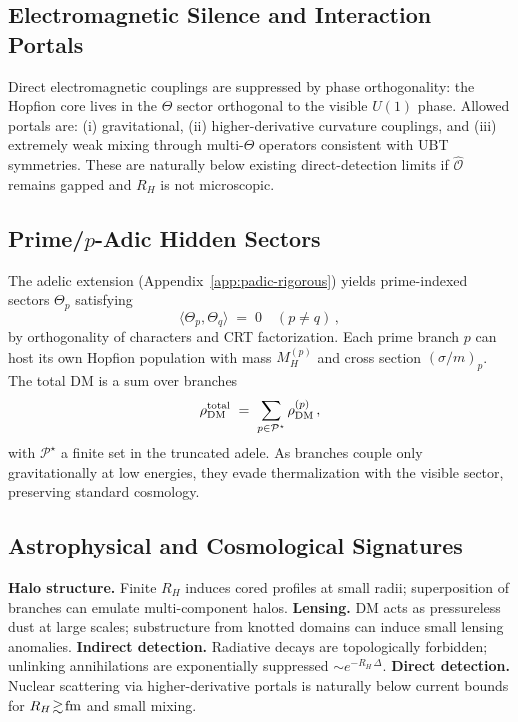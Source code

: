\subsection{Electromagnetic Silence and Interaction Portals}
Direct electromagnetic couplings are suppressed by phase orthogonality: the Hopfion core lives in the $\Theta$ sector orthogonal to the visible $U(1)$ phase.
Allowed portals are: (i) gravitational, (ii) higher-derivative curvature couplings, and (iii) extremely weak mixing through multi-$\Theta$ operators consistent with UBT symmetries.
These are naturally below existing direct-detection limits if $\hat{\mathcal{O}}$ remains gapped and $R_H$ is not microscopic.

\subsection{Prime/$p$-Adic Hidden Sectors}
The adelic extension (Appendix~\ref{app:padic-rigorous}) yields prime-indexed sectors $\Theta_p$ satisfying
\begin{equation}
\langle \Theta_p,\Theta_q\rangle \;=\; 0 \quad (p\neq q)\,,
\end{equation}
by orthogonality of characters and CRT factorization.
Each prime branch $p$ can host its own Hopfion population with mass $M_H^{(p)}$ and cross section $(\sigma/m)_p$.
The total DM is a sum over branches
\begin{equation}
\rho_{\rm DM}^{\rm total} \;=\; \sum_{p\in\mathcal{P}^\star}\rho_{\rm DM}^{(p)} \,,
\end{equation}
with $\mathcal{P}^\star$ a finite set in the truncated adele. As branches couple only gravitationally at low energies, they evade thermalization with the visible sector, preserving standard cosmology.

\subsection{Astrophysical and Cosmological Signatures}
\textbf{Halo structure.} Finite $R_H$ induces cored profiles at small radii; superposition of branches can emulate multi-component halos.
\textbf{Lensing.} DM acts as pressureless dust at large scales; substructure from knotted domains can induce small lensing anomalies.
\textbf{Indirect detection.} Radiative decays are topologically forbidden; unlinking annihilations are exponentially suppressed $\sim e^{-R_H\,\Delta}$.
\textbf{Direct detection.} Nuclear scattering via higher-derivative portals is naturally below current bounds for $R_H\!\gtrsim\!{\rm fm}$ and small mixing.

